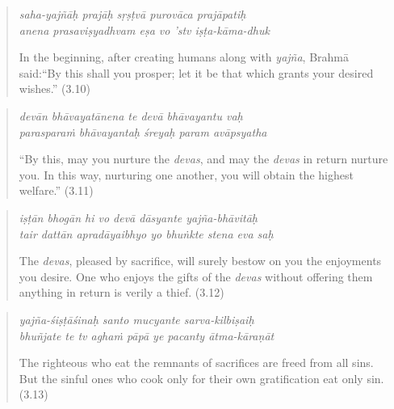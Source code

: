 \documentclass[12pt, twoside, openright]{memoir}
\begin{document}
\par
\begin{verse}
\textit{saha-yajñāḥ prajāḥ sṛṣṭvā purovāca prajāpatiḥ} \\
\textit{anena prasaviṣyadhvam eṣa vo ’stv iṣṭa-kāma-dhuk}

\noindent In the beginning, after creating humans along with \textit{yajña}, Brahmā said:\linebreak \enquote{By this shall you prosper; let it be that which grants your desired wishes.} (3.10)
\end{verse}
\par



\par
\begin{verse}
\textit{devān bhāvayatānena te devā bhāvayantu vaḥ} \\
\textit{parasparaṁ bhāvayantaḥ śreyaḥ param avāpsyatha}

\noindent \enquote{By this, may you nurture the \textit{devas}, and may the \textit{devas} in return nurture you. In this way, nurturing one another, you will obtain the highest welfare.} (3.11)
\end{verse}
\par



\par
\begin{verse}
\textit{iṣṭān bhogān hi vo devā dāsyante yajña-bhāvitāḥ} \\
\textit{tair dattān apradāyaibhyo yo bhuṅkte stena eva saḥ}

\noindent The \textit{devas}, pleased by sacrifice, will surely bestow on you the enjoyments you desire. One who enjoys the gifts of the \textit{devas} without offering them anything in return is verily a thief. (3.12)
\end{verse}
\par



\par
\begin{verse}
\textit{yajña-śiṣṭāśinaḥ santo mucyante sarva-kilbiṣaiḥ} \\
\textit{bhuñjate te tv aghaṁ pāpā ye pacanty ātma-kāraṇāt}

\noindent The righteous who eat the remnants of sacrifices are freed from all sins. But the sinful ones who cook only for their own gratification eat only sin. (3.13)
\end{verse}
\par
\end{document}
